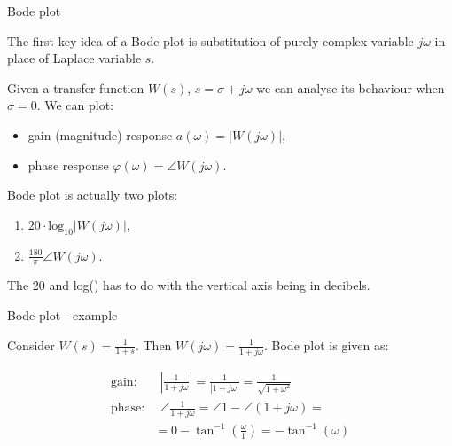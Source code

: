 \documentclass{beamer}
\begin{document}
\begin{frame}{Bode plot}
\begin{flushleft}

The first key idea of a Bode plot is substitution of purely complex variable $j \omega$ in place of Laplace variable $s$.

\bigskip

Given a transfer function $W(s)$, $s = \sigma + j \omega$ we can analyse its behaviour when $\sigma = 0$. We can plot:

\begin{itemize}
	\item  gain (magnitude) response $a(\omega) = \left| W(j \omega) \right|$,
	
	\item phase response $\varphi(\omega) = \angle W(j\omega)$.
\end{itemize}


\bigskip
 
Bode plot is actually two plots: 

\begin{enumerate}
	\item  $20 \cdot \text{log}_{10}\left| W(j \omega) \right|$,
	
	\item $\frac{180}{\pi} \angle W(j\omega)$.
\end{enumerate}

The 20 and log() has to do with the vertical axis being in decibels. 

\end{flushleft}
\end{frame}




\begin{frame}{Bode plot - example}
\begin{flushleft}

Consider $W(s) = \frac{1}{1 + s}$. Then $W(j \omega) = \frac{1}{1 + j \omega}$. Bode plot is given as:

\begin{align}
    \text{gain:}& \ \ 
    \left|  \frac{1}{1 + j \omega} \right| =  \frac{1}{|1 + j \omega|} = 
   \frac{1}{\sqrt{1 + \omega^2}}
\\
	\text{phase:}& \ \ 
   \angle \frac{1}{1 + j \omega} = \angle 1 - \angle (1 + j \omega) = \\ &= 0 - \tan^{-1} \left( \frac{\omega}{1} \right) = -\tan^{-1}(\omega)
\end{align}

\end{flushleft}
\end{frame}
\end{document}
